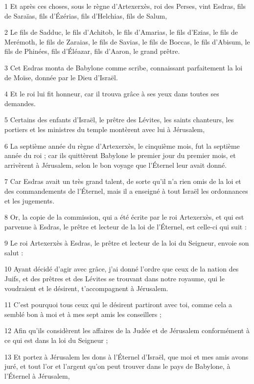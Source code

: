 
\par 1 Et après ces choses, sous le règne d'Artexerxès, roi des Perses, vint Esdras, fils de Saraïas, fils d'Ézérias, fils d'Helchias, fils de Salum,
\par 2 Le fils de Sadduc, le fils d'Achitob, le fils d'Amarias, le fils d'Ezias, le fils de Merémoth, le fils de Zaraias, le fils de Savias, le fils de Boccas, le fils d'Abisum, le fils de Phinées, fils d'Éléazar, fils d'Aaron, le grand prêtre.
\par 3 Cet Esdras monta de Babylone comme scribe, connaissant parfaitement la loi de Moïse, donnée par le Dieu d'Israël.
\par 4 Et le roi lui fit honneur, car il trouva grâce à ses yeux dans toutes ses demandes.
\par 5 Certains des enfants d'Israël, le prêtre des Lévites, les saints chanteurs, les portiers et les ministres du temple montèrent avec lui à Jérusalem,
\par 6 La septième année du règne d'Artexerxès, le cinquième mois, fut la septième année du roi ; car ils quittèrent Babylone le premier jour du premier mois, et arrivèrent à Jérusalem, selon le bon voyage que l'Éternel leur avait donné.
\par 7 Car Esdras avait un très grand talent, de sorte qu'il n'a rien omis de la loi et des commandements de l'Éternel, mais il a enseigné à tout Israël les ordonnances et les jugements.
\par 8 Or, la copie de la commission, qui a été écrite par le roi Artexerxès, et qui est parvenue à Esdras, le prêtre et lecteur de la loi de l'Éternel, est celle-ci qui suit :
\par 9 Le roi Artexerxès à Esdras, le prêtre et lecteur de la loi du Seigneur, envoie son salut :
\par 10 Ayant décidé d'agir avec grâce, j'ai donné l'ordre que ceux de la nation des Juifs, et des prêtres et des Lévites se trouvant dans notre royaume, qui le voudraient et le désirent, t'accompagnent à Jérusalem.
\par 11 C'est pourquoi tous ceux qui le désirent partiront avec toi, comme cela a semblé bon à moi et à mes sept amis les conseillers ;
\par 12 Afin qu'ils considèrent les affaires de la Judée et de Jérusalem conformément à ce qui est dans la loi du Seigneur ;
\par 13 Et portez à Jérusalem les dons à l'Éternel d'Israël, que moi et mes amis avons juré, et tout l'or et l'argent qu'on peut trouver dans le pays de Babylone, à l'Éternel à Jérusalem,
